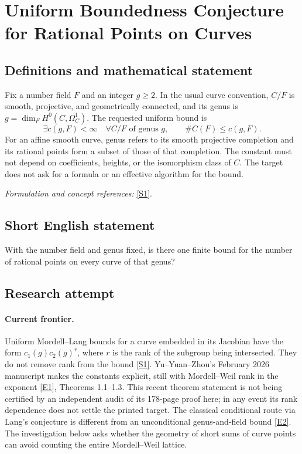 \documentclass[11pt,a4paper]{article}
\newcommand{\sref}[2]{\hyperlink{source:#1:#2}{[S#2]}}
\newcommand{\eref}[2]{\hyperlink{extra:#1:#2}{[E#2]}}
\newif\ifshowcatalogue
\newcommand{\cataloguescope}[1]{\ifshowcatalogue
 \paragraph{Exact scope in the supplied catalogue.}
 \begin{quote}\small #1\end{quote}\fi}
\numberwithin{equation}{section}
\begin{document}
\setcounter{section}{0}
\clearpage
\section*{\texorpdfstring{Uniform Boundedness Conjecture for Rational Points on Curves}{Uniform Boundedness Conjecture for Rational Points on Curves}}\label{30006763}
\subsection{Definitions and mathematical statement}
Fix a number field $F$ and an integer $g\ge2$. In the usual curve convention, $C/F$ is smooth, projective, and geometrically connected, and its genus is $g=\dim_F H^0(C,\Omega_C^1)$. The requested uniform bound is
\[
 \exists c(g,F)<\infty\quad\forall C/F\text{ of genus }g,
 \qquad\#C(F)\le c(g,F).
\]
For an affine smooth curve, genus refers to its smooth projective completion and its rational points form a subset of those of that completion. The constant must not depend on coefficients, heights, or the isomorphism class of $C$. The target does not ask for a formula or an effective algorithm for the bound.
\par\smallskip\textit{Formulation and concept references:} \sref{30006763}{1}.
\cataloguescope{For each integer g >= 2 and number field F, prove that there is a constant c(g,F) such that every smooth curve C of genus g over F has at most c(g,F) F-rational points.}
\subsection{Short English statement}
With the number field and genus fixed, is there one finite bound for the number of rational points on every curve of that genus?
\subsection{Research attempt}

\paragraph{Current frontier.}
Uniform Mordell--Lang bounds for a curve embedded in its Jacobian have
the form $c_1(g)c_2(g)^r$, where $r$ is the rank of the subgroup being
intersected. They do not remove rank from the bound
\sref{30006763}{1}. Yu--Yuan--Zhou's February 2026 manuscript makes the
constants explicit, still with Mordell--Weil rank in the exponent
\eref{30006763}{1}, Theorems 1.1--1.3. This recent theorem statement is not
being certified by an independent audit of its 178-page proof here; in
any event its rank dependence does not settle the printed target.
The classical conditional route via Lang's conjecture is different from
an unconditional genus-and-field bound \eref{30006763}{2}. The investigation
below asks whether the geometry of short sums of curve points can avoid
counting the entire Mordell--Weil lattice.
\end{document}
